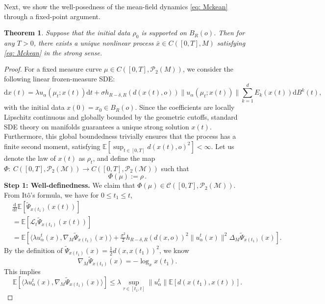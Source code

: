 \documentclass[11pt]{amsart}
\newtheorem{theorem}{Theorem}[section]
\newcommand{\calC}{\mathcal{C}}
\newcommand{\calM}{\mathcal{M}}
\newcommand{\calP}{\mathcal{P}}
\newcommand{\bE}{\mathbb{E}}
\def\d{\mathrm{d}}
\newcommand{\p}{o}%
\newcommand{\dist}{d}%
\begin{document}
 



Next, we show the well-posedness of the mean-field dynamics \eqref{eq: Mckean} through a fixed-point argument.



\begin{theorem}  \label{thm:T3.2}
Suppose that the initial data $\rho_0$ is supported on $B_R(\p)$. Then for any $T>0$, there exists a unique nonlinear process $\bar x \in C([0,T], M)$ satisfying \eqref{eq: Mckean} in the strong sense. 
\end{theorem}

\begin{proof}
For a fixed measure curve $\mu \in C([0,T], \mathcal{P}_2(M))$, we consider the following linear frozen-measure SDE:
\begin{equation*} 
\d x(t)=\lambda u_\alpha(\mu_t;x(t))\d t+\sigma h_{R-\delta, R}(\dist(x(t), \p))\|u_\alpha(\mu_t;x(t))\| \sum_{k=1}^d E_k(x(t))\d B^k(t),
\end{equation*}
with the initial data $x(0)=x_0 \in B_{R}(\p)$. Since the coefficients are locally Lipschitz continuous and globally bounded by the geometric cutoffs, standard SDE theory on manifolds guarantees a unique strong solution $x(t)$. Furthermore, this global boundedness trivially ensures that the process has a finite second moment, satisfying $\mathbb{E}[\sup_{t\in[0,T]}\dist(x(t),\p)^2]<\infty$.
Let us denote the law of $x(t)$ as $\rho_t$, and define the map $\Phi:~C([0,T],\calP_2(\calM))\to C([0,T],\calP_2(\calM))$ such that
\begin{equation*}
    \Phi(\mu):=\rho\,.
\end{equation*}
\textbf{Step 1: Well-definedness.} We  claim that $\Phi(\mu)\in \calC([0,T],\calP_2(\calM))$. From Itô's formula, we have for $0\leq t_1\leq t$,
\begin{align*}
&\frac{\d}{\d t}\bE[\tilde{\Psi}_{x(t_1)}(x(t))]\\
&=\bE[\mathcal{L}_t\tilde{\Psi}_{x(t_1)}(x(t))]\\
&=\bE\left[\langle\lambda u_\alpha^t(x),\nabla_M\tilde{\Psi}_{x(t_1)}(x)\rangle+\frac{\sigma^2}{2}h_{R-\delta, R}(\dist(x, \p))^2\|u_\alpha^t(x)\|^2\Delta_M\tilde{\Psi}_{x(t_1)}(x)\right].
\end{align*}
By the definition of $\tilde{\Psi}_{x(t_1)}(x)=\frac{1}{2}\dist(x, x(t_1))^2$, we know
\[
\nabla_M\tilde{\Psi}_{x(t_1)}(x)=-\log_{x}x(t_1).
\]
This implies
\[
\bE[\langle\lambda u_\alpha^t(x),\nabla_M\tilde{\Psi}_{x(t_1)}(x)\rangle]\leq \lambda\sup_{\tau\in[t_1, t]}\|u_\alpha^t\|\bE\left[\dist(x(t_1), x(t))\right].
\]
\end{proof}
\end{document}
